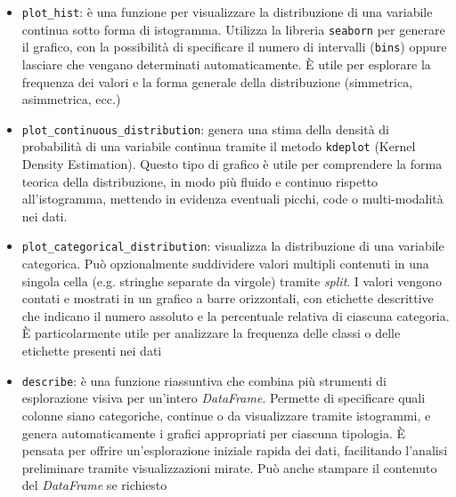 \begin{itemize}

  \item \texttt{plot\_hist}: è una funzione per visualizzare la distribuzione di una variabile continua sotto forma di istogramma. Utilizza la libreria \texttt{seaborn} per generare il grafico, con la possibilità di specificare il numero di intervalli (\texttt{bins}) oppure lasciare che vengano determinati automaticamente. È utile per esplorare la frequenza dei valori e la forma generale della distribuzione (simmetrica, asimmetrica, ecc.)

  \item \texttt{plot\_continuous\_distribution}: genera una stima della densità di probabilità di una variabile continua tramite il metodo \texttt{kdeplot} (Kernel Density Estimation). Questo tipo di grafico è utile per comprendere la forma teorica della distribuzione, in modo più fluido e continuo rispetto all'istogramma, mettendo in evidenza eventuali picchi, code o multi-modalità nei dati.

  \item \texttt{plot\_categorical\_distribution}: visualizza la distribuzione di una variabile categorica. Può opzionalmente suddividere valori multipli contenuti in una singola cella (e.g. stringhe separate da virgole) tramite \textit{split}. I valori vengono contati e mostrati in un grafico a barre orizzontali, con etichette descrittive che indicano il numero assoluto e la percentuale relativa di ciascuna categoria. È particolarmente utile per analizzare la frequenza delle classi o delle etichette presenti nei dati

  \item \texttt{describe}: è una funzione riassuntiva che combina più strumenti di esplorazione visiva per un'intero \textit{DataFrame}. Permette di specificare quali colonne siano categoriche, continue o da visualizzare tramite istogrammi, e genera automaticamente i grafici appropriati per ciascuna tipologia. È pensata per offrire un'esplorazione iniziale rapida dei dati, facilitando l'analisi preliminare tramite visualizzazioni mirate. Può anche stampare il contenuto del \textit{DataFrame} se richiesto

\end{itemize}